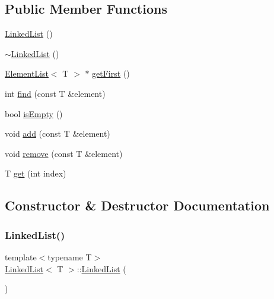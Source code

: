 \subsection*{Public Member Functions}
\begin{DoxyCompactItemize}
\item 
\mbox{\hyperlink{class_linked_list_a3c20fcfec867e867f541061a09fc640c}{Linked\+List}} ()
\item 
\mbox{\hyperlink{class_linked_list_a7c37609df3b83bc4eb0281b852f93fd7}{$\sim$\+Linked\+List}} ()
\item 
\mbox{\hyperlink{struct_element_list}{Element\+List}}$<$ T $>$ $\ast$ \mbox{\hyperlink{class_linked_list_a4ea79e8ffd6bb92736df640d86a04705}{get\+First}} ()
\item 
int \mbox{\hyperlink{class_linked_list_a6f359c1f8a9fded8c89d00a97c4287fb}{find}} (const T \&element)
\item 
bool \mbox{\hyperlink{class_linked_list_a7ecbb28e82117a680839ed0dc28ebdce}{is\+Empty}} ()
\item 
void \mbox{\hyperlink{class_linked_list_a0083b3395050b2e601388bc7872a03d8}{add}} (const T \&element)
\item 
void \mbox{\hyperlink{class_linked_list_a464f248b57c763a253f9bba018d1a857}{remove}} (const T \&element)
\item 
T \mbox{\hyperlink{class_linked_list_a25079ed9b408efad63a1522c818d8705}{get}} (int index)
\end{DoxyCompactItemize}


\subsection{Constructor \& Destructor Documentation}
\mbox{\label{class_linked_list_a3c20fcfec867e867f541061a09fc640c}} 
\subsubsection{\texorpdfstring{Linked\+List()}{LinkedList()}}
{\footnotesize\ttfamily template$<$typename T$>$ \\
\mbox{\hyperlink{class_linked_list}{Linked\+List}}$<$ T $>$\+::\mbox{\hyperlink{class_linked_list}{Linked\+List}} (\begin{DoxyParamCaption}{ }\end{DoxyParamCaption})\hspace{0.3cm}{\ttfamily [inline]}}


